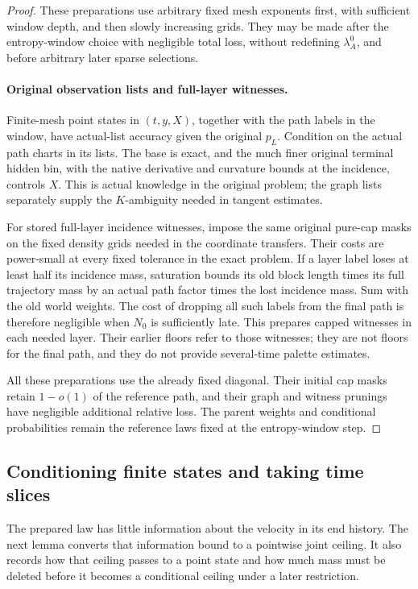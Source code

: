 \begin{proof}
These preparations use arbitrary fixed mesh exponents first,
with sufficient window depth, and then slowly increasing grids.
They may be made after the entropy-window choice with negligible
total loss, without redefining \(\lambda_A^0\), and before arbitrary
later sparse selections.

\paragraph{Original observation lists and full-layer witnesses.}
Finite-mesh point states in \((t,y,X)\), together with the
path labels in the window, have actual-list accuracy given the
original \(p_L\).  Condition on the actual path charts in its
lists.  The base is exact, and the much finer original terminal
hidden bin, with the native derivative and curvature bounds at
the incidence, controls \(X\).  This is actual knowledge in the
original problem; the graph lists separately supply the
\(K\)-ambiguity needed in tangent estimates.

For stored full-layer incidence witnesses, impose the same original
pure-cap masks on the fixed density grids needed in the coordinate
transfers.  Their costs are power-small at every fixed tolerance in
the exact problem.  If a layer label loses at least half its incidence
mass, saturation bounds its old block length times its full trajectory
mass by an actual path factor times the lost incidence mass.  Sum with
the old world weights.  The cost of dropping all such labels from the
final path is therefore negligible when \(N_0\) is sufficiently late.
This prepares capped witnesses in each needed layer.  Their earlier
floors refer to those witnesses; they are not floors for the final path,
and they do not provide several-time palette estimates.

All these preparations use the already fixed diagonal.  Their initial
cap masks retain \(1-o(1)\) of the reference path, and their graph and
witness prunings have negligible additional relative loss.  The parent
weights and conditional probabilities remain the reference laws fixed
at the entropy-window step.
\end{proof}

\subsection{Conditioning finite states and taking time slices}

The prepared law has little information about the velocity in its end
history.  The next lemma converts that information bound to a pointwise
joint ceiling.  It also records how that ceiling passes to a point state
and how much mass must be deleted before it becomes a conditional
ceiling under a later restriction.

